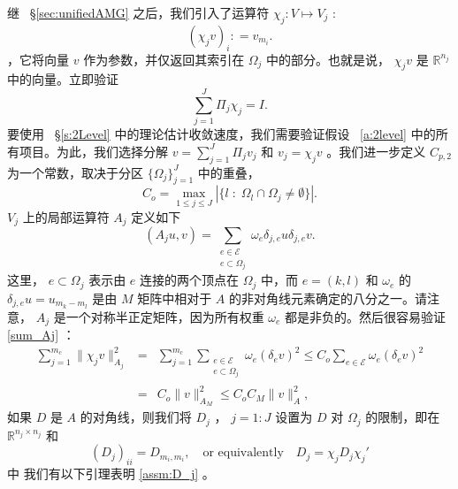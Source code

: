 \documentclass[12pt]{acta_2011xz}
\newcommand{\co}{\ensuremath{C_{o}}}
\begin{document}
继~    \S       \ref{sec:unifiedAMG}    之后，我们引入了运算符    $\chi_j: V\mapsto V_j$    :
   \begin{equation}
    (\chi_jv)_i: = v_{m_i}.
\end{equation}    ，它将向量    $v$    作为参数，并仅返回其索引在    $\Omega_j$    中的部分。也就是说，   $\chi_j v$    是
   $\mathbb{R}^{n_j}$    中的向量。立即验证
   \begin{equation*}
    \sum_{j=1}^J\Pi_j\chi_j= I.
\end{equation*}    要使用~    \S       \ref{s:2Level}    中的理论估计收敛速度，我们需要验证假设~    \ref{a:2level}    中的所有项目。为此，我们选择分解    $v=\sum_{j=1}^J \Pi_j v_j$    和
   $v_j=\chi_jv$    。我们进一步定义
   $C_{p,2}$    为一个常数，取决于分区    $ \{ \Omega_j \} _{j=1}^J$    中的重叠，
   \begin{equation}
  \co=
  \max_{1\le j \le J} \left| \{ l\; : \; \Omega_l\cap \Omega_j \neq \emptyset \} \right|.
    \end{equation}       $V_j$    上的局部运算符    $A_j$    定义如下
   \begin{equation}\label{Aj}
        (A_ju, v)=\sum_{\substack{e\in \mathcal E \\ e\subset \Omega_j}}\omega_e\delta_{j,e}u\delta_{j,e}v.
    \end{equation}    这里，   $e\subset \Omega_j$    表示由    $e$    连接的两个顶点在    $\Omega_j$    中，而    $e=(k, l)$    和    $\omega_e$    的    $\delta_{j, e}u=u_{m_k-m_l}$    是由    $M$    矩阵中相对于    $A$    的非对角线元素确定的八分之一。请注意，
   $A_j$    是一个对称半正定矩阵，因为所有权重    $\omega_e$    都是非负的。然后很容易验证    \eqref{sum_Aj}   ：
   \begin{equation}\label{verifyA}
    \begin{array}{rcl}
      \sum_{j=1}^{m_c}\|\chi_jv\|_{A_j}^2&=&\sum_{j=1}^{m_c}\sum_{\substack{e\in \mathcal E \\ e\subset \Omega_j}}\omega_e(\delta_ev)^2\le \co\sum_{e\in \mathcal E}\omega_e(\delta_e v)^2 \\ 
                                         &=& \co\|v\|_{A_M}^2\le \co C_M\|v\|_A^2,
    \end{array}
\end{equation}    如果    $D$    是    $A$    的对角线，则我们将    $D_j$    ，    $j=1:J$    设置为    $D$    对    $\Omega_j$    的限制，即在
   $\mathbb{R}^{n_j\times n_j}$    和
   \begin{equation}\label{local_diag}
    (D_j)_{ii}=D_{m_i, m_i}, \quad\mbox{or equivalently}\quad D_j=\chi_jD_j\chi_j'
\end{equation}    中 我们有以下引理表明    \eqref{assm:D_j}    。
\end{document}
